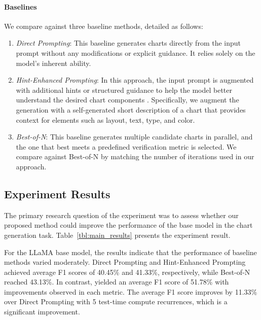 \paragraph{Baselines}
We compare \model{} against three baseline methods, detailed as follows:
\begin{enumerate}
    \setlength{\itemsep}{0pt}
    \setlength{\parsep}{0pt}
    \setlength{\topsep}{0pt}
    \item \textit{Direct Prompting}: This baseline generates charts directly from the input prompt without any modifications or explicit guidance. It relies solely on the model's inherent ability.
    \item \textit{Hint-Enhanced Prompting}: In this approach, the input prompt is augmented with additional hints or structured guidance to help the model better understand the desired chart components \cite{wang2024hint}. Specifically, we augment the generation with a self-generated short description of a chart that provides context for elements such as layout, text, type, and color.
    \item \textit{Best-of-N}: This baseline generates multiple candidate charts in parallel, and the one that best meets a predefined verification metric is selected. We compare against Best-of-N by matching the number of iterations used in our approach.
\end{enumerate}



\subsection{Experiment Results}
\label{sec:exp_res}

The primary research question of the experiment was to assess whether our proposed method could improve the performance of the base model in the chart generation task. Table~\ref{tbl:main_results} presents the experiment result.

For the LLaMA base model, the results indicate that the performance of baseline methods varied moderately. Direct Prompting and Hint-Enhanced Prompting achieved average F1 scores of 40.45\% and 41.33\%, respectively, while Best-of-N reached 43.13\%. In contrast, \model{} yielded an average F1 score of 51.78\% with improvements observed in each metric. The average F1 score improves by 11.33\% over Direct Prompting with 5 test-time compute recurrences, which is a significant improvement.

